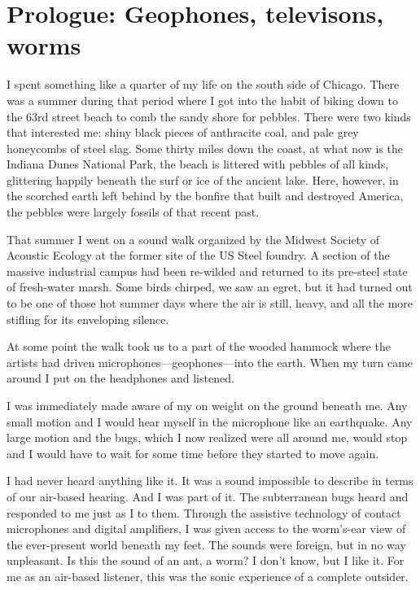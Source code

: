 \documentclass[12pt,letterpaper]{article}
\begin{document}
	\newpage
	\section*{Prologue: Geophones, televisons, worms}

	I spent something like a quarter of my life on the south side of 
	Chicago. There was a summer during that period where I got into the 
	habit of biking down to the 63rd street beach to comb the sandy shore 
	for pebbles. There were two kinds that interested me: shiny black 
	pieces of anthracite coal, and pale grey honeycombs of steel slag. Some
	thirty miles down the coast, at what now is the Indiana Dunes National 
	Park, the beach is littered with pebbles of all kinds, glittering 
	happily beneath the surf or ice of the ancient lake. Here, however, in 
	the scorched earth left behind by the bonfire that built and destroyed 
	America, the pebbles were largely fossils of that recent past.

	That summer I went on a sound walk organized by the Midwest Society of
	Acoustic Ecology at the former site of the US Steel foundry. A section 
	of the massive industrial campus had been re-wilded and returned to its
	pre-steel state of fresh-water marsh. Some birds chirped, we saw an 
	egret, but it had turned out to be one of those hot summer days where 
	the air is still, heavy, and all the more stifling for its enveloping 
	silence. 

	At some point the walk took us to a part of the wooded hammock where 
	the artists had driven microphones---geophones---into the earth. When 
	my turn came around I put on the headphones and listened. 

	I was immediately made aware of my on weight on the ground beneath me. 
	Any small motion and I would hear myself in the microphone like an 
	earthquake. Any large motion and the bugs, which I now realized were all
	around me, would stop and I would have to wait for some time before they
	started to move again. 

	I had never heard anything like it. It was a sound impossible to 
	describe in terms of our air-based hearing. And I was part of it. The 
	subterranean bugs heard and responded to me just as I to them. Through 
	the assistive technology of contact microphones and digital amplifiers, 
	I was given access to the worm's-ear view of the ever-present world 
	beneath my feet. The sounds were foreign, but in no way unpleasant. Is 
	this the sound of an ant, a worm? I don't know, but I like it. For me as
	an air-based listener, this was the sonic experience of a complete 
	outsider.	
\end{document}
